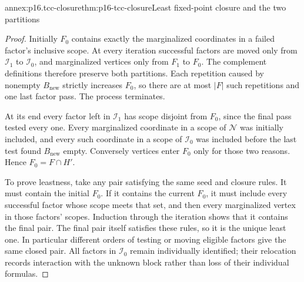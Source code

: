 \begin{annexitem}{annex:p16.tcc-closure}{thm:p16-tcc-closure}{Least fixed-point closure and the two partitions}
\begin{proof}
Initially \(F_0\) contains exactly the marginalized coordinates
in a failed factor's inclusive scope. At every iteration successful
factors are moved only from \(\mathcal I_1\) to \(\mathcal I_0\),
and marginalized vertices only from \(F_1\) to \(F_0\).
The complement definitions therefore preserve both partitions.
Each repetition caused by nonempty \(B_{\mathrm{new}}\)
strictly increases \(F_0\), so there are at most \(|F|\)
such repetitions and one last factor pass. The process terminates.

At its end every factor left in \(\mathcal I_1\) has scope
disjoint from \(F_0\), since the final pass tested every one.
Every marginalized coordinate in a scope of \(\mathcal N\)
was initially included, and every such coordinate in a scope of
\(\mathcal I_0\) was included before the last test found
\(B_{\mathrm{new}}\) empty. Conversely vertices enter \(F_0\)
only for those two reasons. Hence \(F_0=F\cap H'\).

To prove leastness, take any pair satisfying the same seed and
closure rules. It must contain the initial \(F_0\). If it
contains the current \(F_0\), it must include every successful
factor whose scope meets that set, and then every marginalized
vertex in those factors' scopes. Induction through the iteration
shows that it contains the final pair. The final pair itself
satisfies these rules, so it is the unique least one. In particular
different orders of testing or moving eligible factors give the
same closed pair. All factors in \(\mathcal I_0\) remain
individually identified; their relocation records interaction with
the unknown block rather than loss of their individual formulas.
\end{proof}
\end{annexitem}


